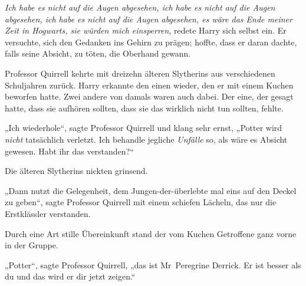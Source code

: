 \emph{Ich habe es nicht auf die Augen abgesehen, ich habe es nicht auf die Augen abgesehen, ich habe es nicht auf die Augen abgesehen, es wäre das Ende meiner Zeit in Hogwarts, sie würden mich einsperren}, redete Harry sich selbst ein. Er versuchte, sich den Gedanken ins Gehirn zu prägen; hoffte, dass er daran dachte, falls seine Absicht, zu töten, die Oberhand gewann.

Professor Quirrell kehrte mit dreizehn älteren Slytherins aus verschiedenen Schuljahren zurück. Harry erkannte den einen wieder, den er mit einem Kuchen beworfen hatte. Zwei andere von damals waren auch dabei. Der eine, der gesagt hatte, dass sie aufhören sollten, dass sie das wirklich nicht tun sollten, fehlte.

„Ich wiederhole“, sagte Professor Quirrell und klang sehr ernst,
„Potter wird \emph{nicht} tatsächlich verletzt. Ich behandle jegliche \emph{Unfälle} so, als wäre es Absicht gewesen. Habt ihr das verstanden?“

Die älteren Slytherins nickten grinsend.

„Dann nutzt die Gelegenheit, dem Jungen-der-überlebte mal eins auf den Deckel zu geben“, sagte Professor Quirrell mit einem schiefen Lächeln, das nur die Erstklässler verstanden.

Durch eine Art stille Übereinkunft stand der vom Kuchen Getroffene ganz vorne in der Gruppe.

„Potter“, sagte Professor Quirrell, „das ist Mr~Peregrine Derrick. Er ist besser als du und das wird er dir jetzt zeigen.“

